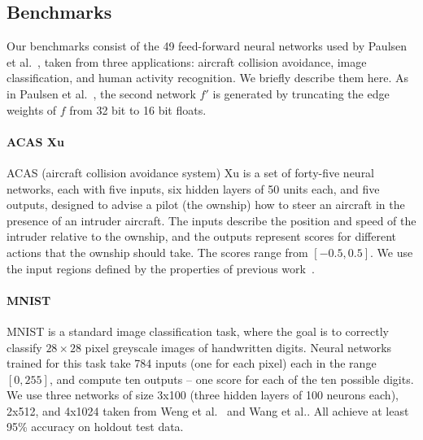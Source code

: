 

\subsection{Benchmarks}

Our benchmarks consist of the 49 feed-forward neural networks used by
Paulsen et al.~\cite{paulsen2020reludiff}, taken from three applications:
aircraft collision avoidance, image classification, and human activity
recognition. We briefly describe them here. As in Paulsen et
al.~\cite{paulsen2020reludiff}, the second
network $ f' $ is generated by truncating the edge weights of $f$ from
32 bit to 16 bit floats.

\paragraph{ACAS Xu~\cite{JulianKO18}}
ACAS (aircraft collision avoidance system) Xu is a set of
forty-five neural networks, each with five inputs, six hidden layers of 50 units each, and five outputs,
designed to advise a pilot (the ownship) how to steer an aircraft in the presence of an intruder aircraft.
The inputs describe the position and speed of the intruder relative to the ownship, and the
outputs represent scores for different actions that the ownship should take.
The scores range from $ [-0.5, 0.5] $. We use the input regions defined by the properties of previous
work~\cite{KatzBDJK17, WangPWYJ18}.

\paragraph{MNIST~\cite{LecunBBH98}}
MNIST is a standard image classification task, where the goal is to
correctly classify $ 28 \times 28 $ pixel greyscale images of handwritten
digits. Neural networks trained for this task take 784 inputs (one for
each pixel) each in the range $ [0,255] $, and compute ten outputs -- one
score for each of the ten possible digits. We use three networks of size
3x100 (three hidden layers of 100 neurons each), 2x512, and 4x1024 taken from Weng et al.~\cite{WengZCSHDBD18} and
Wang et al.\cite{WangPWYJ18nips}. All achieve at least 95\% accuracy on
holdout test data.

